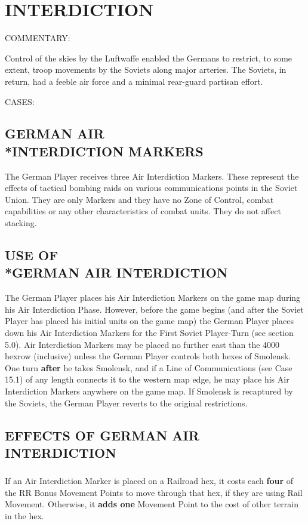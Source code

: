 \section{INTERDICTION}

COMMENTARY:

Control of the skies by the Luftwaffe enabled the Germans to restrict, to some extent, troop movements by the Soviets along major arteries. The Soviets, in return, had a feeble air force and a minimal rear-guard partisan effort.

CASES:

\subsection{GERMAN AIR\\*INTERDICTION MARKERS}

The German Player receives three Air Interdiction Markers. These represent the effects of tactical bombing raids on various communications points in the Soviet Union. They are only Markers and they have no Zone of Control, combat capabilities or any other characteristics of combat units. They do not affect stacking.

\subsection{USE OF\\*GERMAN AIR INTERDICTION}

The German Player places his Air Interdiction Markers on the game map during his Air Interdiction Phase. However, before the game begins (and after the Soviet Player has placed his initial units on the game map) the German Player places down his Air Interdiction Markers for the First Soviet Player-Turn (see section 5.0). Air Interdiction Markers may be placed no further east than the 4000 hexrow (inclusive) unless the German Player controls both hexes of Smolensk. One turn \textbf{after} he takes Smolensk, and if a Line of Communications (see Case 15.1) of any length connects it to the western map edge, he may place his Air Interdiction Markers anywhere on the game map. If Smolensk is recaptured by the Soviets, the German Player reverts to the original restrictions.

\subsection{EFFECTS OF GERMAN AIR INTERDICTION}

\subsubsection{} If an Air Interdiction Marker is placed on a Railroad hex, it costs each \textbf{four} of the RR Bonus Movement Points to move through that hex, if they are using Rail Movement. Otherwise, it \textbf{adds one} Movement Point to the cost of other terrain in the hex.

